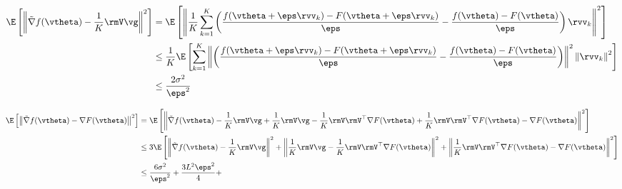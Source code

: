 \begin{equation}
\begin{aligned}
\E\left[\left\|\tilde{\nabla} f(\vtheta) - \frac{1}{K}\rmV\vg\right\|^2\right] &= \E\left[\left\|\frac{1}{K}\sum_{k=1}^K \left(\frac{f(\vtheta+\eps\rvv_k) - F(\vtheta+\eps\rvv_k)}{\eps} - \frac{f(\vtheta) - F(\vtheta)}{\eps}\right)\rvv_k\right\|^2\right] \\
&\leq \frac{1}{K}\E\left[\sum_{k=1}^K \left\| \left(\frac{f(\vtheta+\eps\rvv_k) - F(\vtheta+\eps\rvv_k)}{\eps} - \frac{f(\vtheta) - F(\vtheta)}{\eps}\right)\right\|^2\left\|\rvv_k\right\|^2\right]\\
&\leq \frac{2\sigma^2}{\eps^2}
\end{aligned}
\end{equation}

\begin{equation}
\begin{aligned}
\E\left[\left\|\tilde{\nabla} f(\vtheta) - \nabla F(\vtheta)\right\|^2\right] &= \E\left[\left\|\tilde{\nabla} f(\vtheta) - \frac{1}{K}\rmV\vg +  \frac{1}{K}\rmV\vg - \frac{1}{K}\rmV\rmV^{\top} \nabla F(\vtheta) + \frac{1}{K}\rmV\rmV^{\top} \nabla F(\vtheta) - \nabla F(\vtheta)\right\|^2\right] \\
&\leq 3\E\left[\left\|\tilde{\nabla} f(\vtheta) - \frac{1}{K}\rmV\vg\right\|^2 + \left\|\frac{1}{K}\rmV\vg - \frac{1}{K}\rmV\rmV^{\top} \nabla F(\vtheta)\right\|^2 + \left\|\frac{1}{K}\rmV\rmV^{\top} \nabla F(\vtheta) - \nabla F(\vtheta)\right\|^2\right] \\
&\leq \frac{6\sigma^2}{\eps^2} + \frac{3L^2 \eps^2}{4} + 
\end{aligned}
\end{equation}

